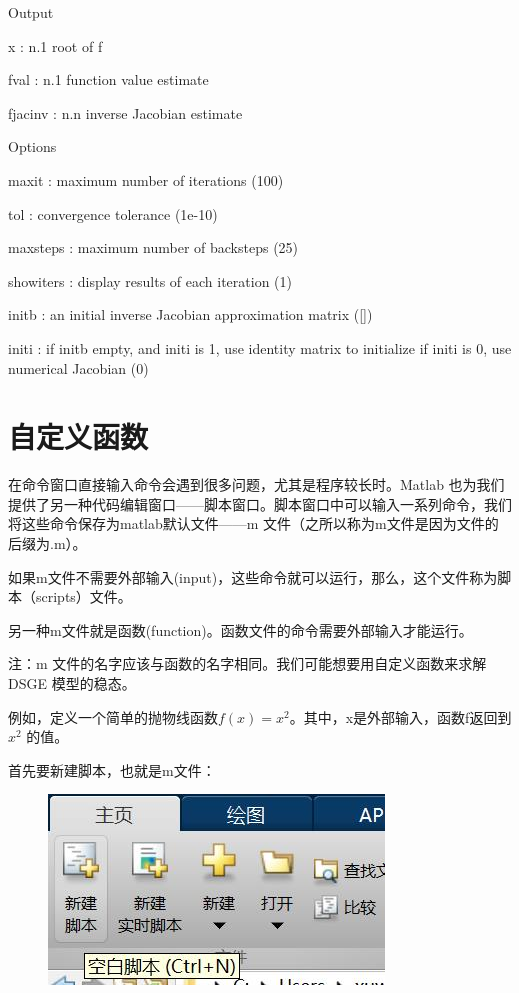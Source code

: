 \documentclass[10pt,math=newtx,citestyle=gb7714-2015,bibstyle=gb7714-2015]{elegantbook}
\begin{document}
{{{	Output
	
	x         : n.1 root of f
	
	fval      : n.1 function value estimate
	
	fjacinv   : n.n inverse Jacobian estimate
	
	Options
	
	maxit     : maximum number of iterations (100)
	
	tol       : convergence tolerance (1e-10)
	
	maxsteps  : maximum number of backsteps (25)
	
	showiters : display results of each iteration (1)
	
	initb     : an initial inverse Jacobian approximation matrix ([])
	
	initi     : if initb empty, and initi is 1, use identity matrix to initialize if initi is 0, use numerical Jacobian (0)
	
	\section{自定义函数}
	
	在命令窗口直接输入命令会遇到很多问题，尤其是程序较长时。Matlab 也为我们提供了另一种代码编辑窗口——脚本窗口。脚本窗口中可以输入一系列命令，我们将这些命令保存为matlab默认文件——m 文件（之所以称为m文件是因为文件的后缀为.m）。
	
	如果m文件不需要外部输入(input)，这些命令就可以运行，那么，这个文件称为脚本（scripts）文件。
	
	另一种m文件就是函数(function)。函数文件的命令需要外部输入才能运行。
	
	注：m 文件的名字应该与函数的名字相同。我们可能想要用自定义函数来求解DSGE 模型的稳态。
	
	例如，定义一个简单的抛物线函数$f(x)=x^2$。其中，x是外部输入，函数f返回到$x^2$ 的值。
	
	首先要新建脚本，也就是m文件：
	\begin{figure}[htbp!]
		\centering
		\includegraphics[width=0.8\linewidth]{FIG/newscript}
		\centering
	\end{figure}
	
}}}
\end{document}

